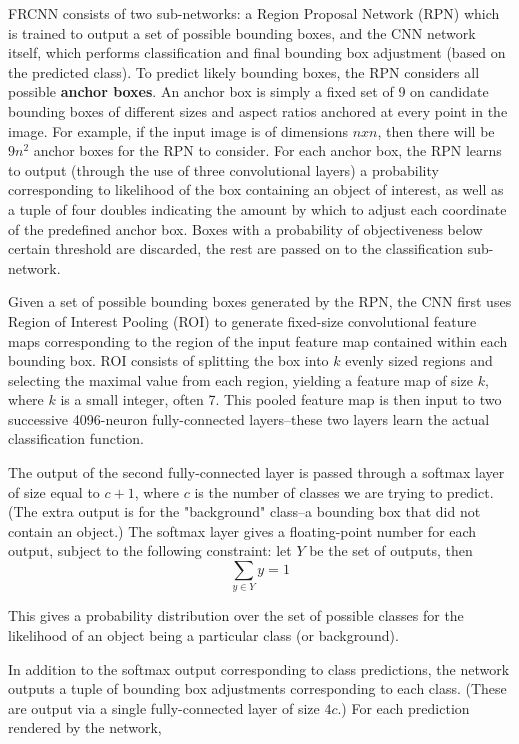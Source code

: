 FRCNN consists of two sub-networks: a Region Proposal Network (RPN) which is trained to output a set of possible bounding boxes, and the CNN network itself, which performs classification and final bounding box adjustment (based on the predicted class). To predict likely bounding boxes, the RPN considers all possible \textbf{anchor boxes}. An anchor box is simply a fixed set of 9 on candidate bounding boxes of different sizes and aspect ratios anchored at every point in the image. For example, if the input image is of dimensions $n x n$, then there will be $9n^2$ anchor boxes for the RPN to consider. For each anchor box, the RPN learns to output (through the use of three convolutional layers) a probability corresponding to likelihood of the box containing an object of interest, as well as a tuple of four doubles indicating the amount by which to adjust each coordinate of the predefined anchor box. Boxes with a probability of objectiveness below  certain threshold are discarded, the rest are passed on to the classification sub-network.

Given a set of possible bounding boxes generated by the RPN, the CNN first uses Region of Interest Pooling (ROI) to generate fixed-size convolutional feature maps corresponding to the region of the input feature map contained within each bounding box. ROI consists of splitting the box into $k$ evenly sized regions and selecting the maximal value from each region, yielding a feature map of size $k$, where $k$ is a small integer, often 7. This pooled feature map is then input to two successive 4096-neuron fully-connected layers--these two layers learn the actual classification function. 

The output of the second fully-connected layer is passed through a softmax layer of size equal to $c + 1$, where $c$ is the number of classes we are trying to predict. (The extra output is for the "background" class--a bounding box that did not contain an object.)  The softmax layer gives a floating-point number for each output, subject to the following constraint: let $Y$ be the set of outputs, then 
\begin{equation}
    \sum\limits_{y \in Y} y = 1
\end{equation}

This gives a probability distribution over the set of possible classes for the likelihood of an object being a particular class (or background).

In addition to the softmax output corresponding to class predictions, the network outputs a tuple of bounding box adjustments corresponding to each class. (These are output via a single fully-connected layer of size $4c$.) For each prediction rendered by the network, 

